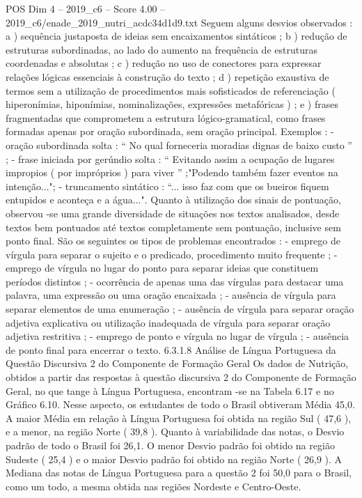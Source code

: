 \begin{textsample}{POS Dim 4 – 2019\_c6 – Score 4.00 – 2019\_c6/enade\_2019\_nutri\_acdc34d1d9.txt}
Seguem alguns desvios observados : a ) sequência justaposta de ideias sem encaixamentos sintáticos ; b ) redução de estruturas subordinadas, ao lado do aumento na frequência de estruturas coordenadas e absolutas ; c ) redução no uso de conectores para expressar relações lógicas essenciais à construção do texto ; d ) repetição exaustiva de termos sem a utilização de procedimentos mais sofisticados de referenciação ( hiperonímias, hiponímias, nominalizações, expressões metafóricas ) ; e ) frases fragmentadas que comprometem a estrutura lógico-gramatical, como frases formadas apenas por oração subordinada, sem oração principal.
Exemplos : - oração subordinada solta : “ No qual forneceria moradias dignas de baixo custo ” ; - frase iniciada por gerúndio solta : “ Evitando assim a ocupação de lugares impropios ( por impróprios ) para viver ” ;"Podendo também fazer eventos na intenção..."; - truncamento sintático : “... isso faz com que os bueiros fiquem entupidos e aconteça e a água...".
Quanto à utilização dos sinais de pontuação, observou -se uma grande diversidade de situações nos textos analisados, desde textos bem pontuados até textos completamente sem pontuação, inclusive sem ponto final.
São os seguintes os tipos de problemas encontrados : - emprego de vírgula para separar o sujeito e o predicado, procedimento muito frequente ; - emprego de vírgula no lugar do ponto para separar ideias que constituem períodos distintos ; - ocorrência de apenas uma das vírgulas para destacar uma palavra, uma expressão ou uma oração encaixada ; - ausência de vírgula para separar elementos de uma enumeração ; - ausência de vírgula para separar oração adjetiva explicativa ou utilização inadequada de vírgula para separar oração adjetiva restritiva ; - emprego de ponto e vírgula no lugar de vírgula ; - ausência de ponto final para encerrar o texto. 6.3.1.8 Análise de Língua Portuguesa da Questão Discursiva 2 do Componente de Formação Geral Os dados de Nutrição, obtidos a partir das respostas à questão discursiva 2 do Componente de Formação Geral, no que tange à Língua Portuguesa, encontram -se na Tabela 6.17 e no Gráfico 6.10.
Nesse aspecto, os estudantes de todo o Brasil obtiveram Média 45,0.
A maior Média em relação à Língua Portuguesa foi obtida na região Sul ( 47,6 ), e a menor, na região Norte ( 39,8 ).
Quanto à variabilidade das notas, o Desvio padrão de todo o Brasil foi 26,1.
O menor Desvio padrão foi obtido na região Sudeste ( 25,4 ) e o maior Desvio padrão foi obtido na região Norte ( 26,9 ).
A Mediana das notas de Língua Portuguesa para a questão 2 foi 50,0 para o Brasil, como um todo, a mesma obtida nas regiões Nordeste e Centro-Oeste.

\end{textsample}

